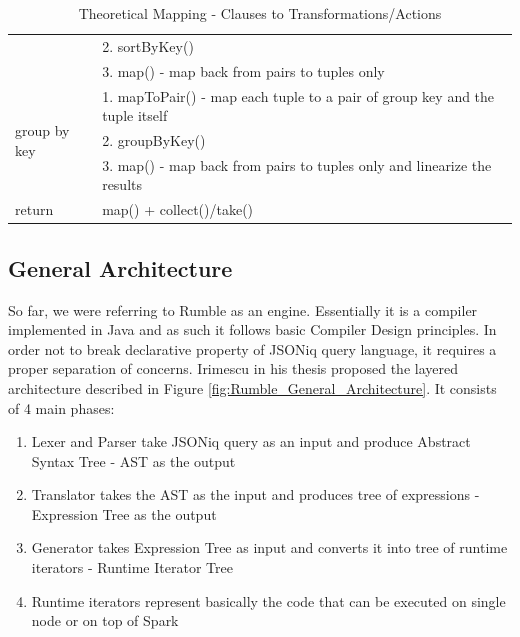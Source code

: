 \begin{table}[h!]
{\begin{tabular}{|l|l|}
			& 2. sortByKey()                                                                                                                                                                 \\ \cline{2-2} 
			& 3. map() - map back from pairs to tuples only                                                                                                                                  \\ \hline
			\multirow{3}{*}{group by key}                           & 1. mapToPair() - map each tuple to a pair of group key and the tuple itself                                                                                                    \\ \cline{2-2} 
			& 2. groupByKey()                                                                                                                                                                \\ \cline{2-2} 
			& 3. map() - map back from pairs to tuples only and linearize the results                                                                                                        \\ \hline
			return                                                  & map() + collect()/take()                                                                                                                                                       \\ \hline
		\end{tabular}%
	}
	\caption{Theoretical Mapping - Clauses to Transformations/Actions}
	\label{tab:ClausesMapping}
\end{table}

\subsection{General Architecture}
\label{sec:RumbleArchitecture}
So far, we were referring to Rumble as an engine. Essentially it is a compiler implemented in Java and as such it follows basic Compiler Design principles. In order not to break declarative property of JSONiq query language, it requires a proper separation of concerns. Irimescu in his thesis \cite{RumbleThesis} proposed the layered architecture described in Figure \ref{fig:Rumble_General_Architecture}. It consists of 4 main phases:
\begin{enumerate}
	\item Lexer and Parser take JSONiq query as an input and produce Abstract Syntax Tree - AST as the output 
	\item Translator takes the AST as the input and produces tree of expressions - Expression Tree as the output
	\item Generator takes Expression Tree as input and converts it into tree of runtime iterators - Runtime Iterator Tree
	\item Runtime iterators represent basically the code that can be executed on single node or on top of Spark
\end{enumerate} 

